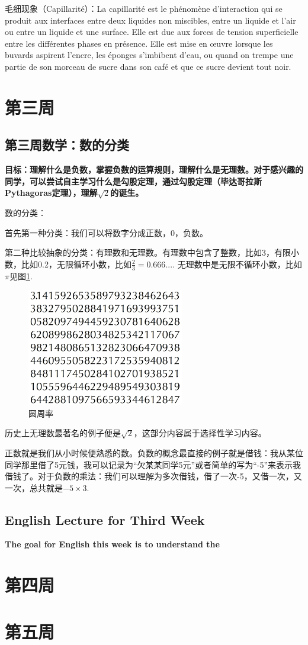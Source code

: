 \documentclass{article}
\theoremstyle{definition}
\theoremstyle{remark}
\theoremstyle{theorem}
\begin{document}
毛细现象（Capillarité）：La capillarité est le phénomène d'interaction qui se produit aux interfaces entre deux liquides non miscibles, entre un liquide et l'air ou entre un liquide et une surface. Elle est due aux forces de tension superficielle entre les différentes phases en présence. Elle est mise en œuvre lorsque les buvards aspirent l’encre, les éponges s’imbibent d’eau, ou quand on trempe une partie de son morceau de sucre dans son café et que ce sucre devient tout noir.
\section{第三周}
\subsection{第三周数学：数的分类}
\textbf{目标：理解什么是负数，掌握负数的运算规则，理解什么是无理数。对于感兴趣的同学，可以尝试自主学习什么是勾股定理，通过勾股定理（毕达哥拉斯Pythagoras定理），理解$\sqrt{2}$的诞生。}

数的分类：

首先第一种分类：我们可以将数字分成正数，0，负数。

第二种比较抽象的分类：有理数和无理数。有理数中包含了整数，比如3，有限小数，比如0.2，无限循环小数，比如$\frac{2}{3}=0.666...$. 无理数中是无限不循环小数，比如$\pi$见图\ref{fig:piirr}.
\begin{figure}
    \centering
    \includegraphics{piirr.png}
    \caption{圆周率}
    \label{fig:piirr}
\end{figure}
历史上无理数最著名的例子便是$\sqrt{2}$，这部分内容属于选择性学习内容。

正数就是我们从小时候便熟悉的数。负数的概念最直接的例子就是借钱：我从某位同学那里借了5元钱，我可以记录为“欠某某同学5元”或者简单的写为“-5”来表示我借钱了。对于负数的乘法：我们可以理解为多次借钱，借了一次-5，又借一次，又一次，总共就是$-5\times 3$.



\subsection{English Lecture for Third Week}
\textbf{The goal for English this week is to understand the }
\section{第四周}
\section{第五周}
\end{document}
